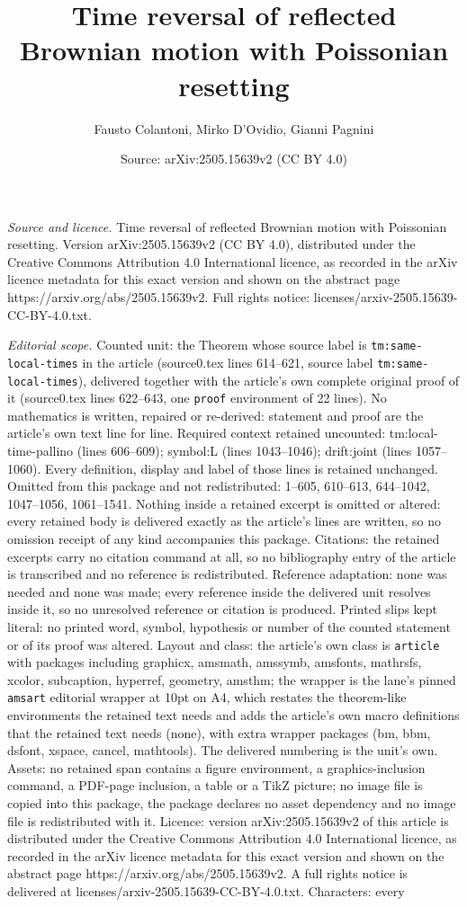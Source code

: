 \documentclass[10pt,a4paper]{amsart}
\title[Time reversal of reflected Brownian motion with Poissonian r]{Time reversal of reflected Brownian motion with Poissonian resetting}
\author{Fausto Colantoni, Mirko D'Ovidio, Gianni Pagnini}
\date{Source: arXiv:2505.15639v2 (CC BY 4.0)}
\begin{document}
\maketitle

\noindent\emph{Source and licence.} Time reversal of reflected Brownian motion with Poissonian resetting. Version arXiv:2505.15639v2 (CC BY 4.0), distributed under the Creative Commons Attribution 4.0 International licence, as recorded in the arXiv licence metadata for this exact version and shown on the abstract page https://arxiv.org/abs/2505.15639v2. Full rights notice: licenses/arxiv-2505.15639-CC-BY-4.0.txt.\par\smallskip

\noindent\textit{Editorial scope.} Counted unit: the Theorem whose source label is \texttt{tm:same-local-times} in the article (source0.tex lines 614--621, source label \texttt{tm:same-local-times}), delivered together with the article's own complete original proof of it (source0.tex lines 622--643, one \texttt{proof} environment of 22 lines). No mathematics is written, repaired or re-derived: statement and proof are the article's own text line for line. Required context retained uncounted: tm:local-time-pallino (lines 606--609); symbol:L (lines 1043--1046); drift:joint (lines 1057--1060). Every definition, display and label of those lines is retained unchanged. Omitted from this package and not redistributed: 1--605, 610--613, 644--1042, 1047--1056, 1061--1541. Nothing inside a retained excerpt is omitted or altered: every retained body is delivered exactly as the article's lines are written, so no omission receipt of any kind accompanies this package. Citations: the retained excerpts carry no citation command at all, so no bibliography entry of the article is transcribed and no reference is redistributed. Reference adaptation: none was needed and none was made; every reference inside the delivered unit resolves inside it, so no unresolved reference or citation is produced. Printed slips kept literal: no printed word, symbol, hypothesis or number of the counted statement or of its proof was altered. Layout and class: the article's own class is \texttt{article} with packages including graphicx, amsmath, amssymb, amsfonts, mathrsfs, xcolor, subcaption, hyperref, geometry, amsthm; the wrapper is the lane's pinned \texttt{amsart} editorial wrapper at 10pt on A4, which restates the theorem-like environments the retained text needs and adds the article's own macro definitions that the retained text needs (none), with extra wrapper packages (bm, bbm, dsfont, xspace, cancel, mathtools). The delivered numbering is the unit's own. Assets: no retained span contains a figure environment, a graphics-inclusion command, a PDF-page inclusion, a table or a TikZ picture; no image file is copied into this package, the package declares no asset dependency and no image file is redistributed with it. Licence: version arXiv:2505.15639v2 of this article is distributed under the Creative Commons Attribution 4.0 International licence, as recorded in the arXiv licence metadata for this exact version and shown on the abstract page https://arxiv.org/abs/2505.15639v2. A full rights notice is delivered at licenses/arxiv-2505.15639-CC-BY-4.0.txt. Characters: every 
\end{document}

